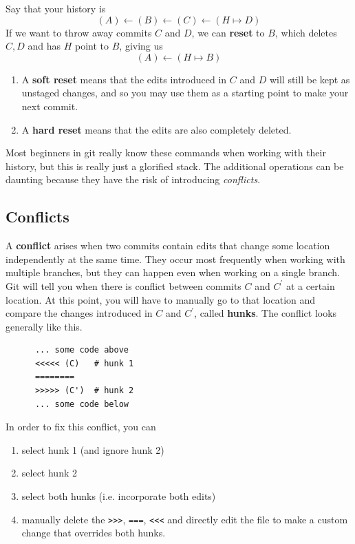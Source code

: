   \begin{definition}[Reset] 
    Say that your history is 
    \begin{equation}
      (A) \leftarrow (B) \leftarrow (C) \leftarrow (H \mapsto D)
    \end{equation}  
    If we want to throw away commits $C$ and $D$, we can \textbf{reset} to $B$, which deletes $C, D$ and has $H$ point to $B$, giving us 
    \begin{equation}
      (A) \leftarrow (H \mapsto B)
    \end{equation} 
    \begin{enumerate}
      \item A \textbf{soft reset} means that the edits introduced in $C$ and $D$ will still be kept as unstaged changes, and so you may use them as a starting point to make your next commit. 
      \item A \textbf{hard reset} means that the edits are also completely deleted. 
    \end{enumerate}
  \end{definition} 

  Most beginners in git really know these commands when working with their history, but this is really just a glorified stack. The additional operations can be daunting because they have the risk of introducing \textit{conflicts}. 

\subsection{Conflicts} 

  \begin{definition}[Conflicts]
    A \textbf{conflict} arises when two commits contain edits that change some location independently at the same time. They occur most frequently when working with multiple branches, but they can happen even when working on a single branch. Git will tell you when there is conflict between commits $C$ and $C^\prime$ at a certain location. At this point, you will have to manually go to that location and compare the changes introduced in $C$ and $C^\prime$, called \textbf{hunks}. The conflict looks generally like this. 
    \begin{lstlisting}
      ... some code above 
      <<<<< (C)   # hunk 1
      ========
      >>>>> (C')  # hunk 2
      ... some code below
    \end{lstlisting} 

    In order to fix this conflict, you can  
    \begin{enumerate}
      \item select hunk 1 (and ignore hunk 2)
      \item select hunk 2 
      \item select both hunks (i.e. incorporate both edits) 
      \item manually delete the \texttt{>>>}, \texttt{===}, \texttt{<<<} and directly edit the file to make a custom change that overrides both hunks. 
    \end{enumerate} 
  \end{definition} 

